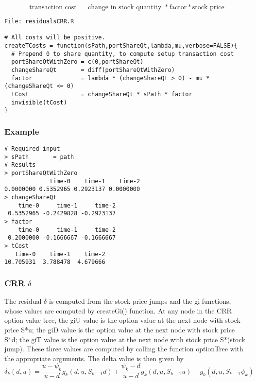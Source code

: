 \documentclass[10pt]{article}
\begin{document}
\[
\text{transaction cost } = \text{change in stock quantity } * \text{factor} * \text{stock price}
\]

\begin{verbatim}
File: residualsCRR.R

# All costs will be positive.
createTCosts = function(sPath,portShareQt,lambda,mu,verbose=FALSE){
  # Prepend 0 to share quantity, to compute setup transaction cost
  portShareQtWithZero = c(0,portShareQt)
  changeShareQt       = diff(portShareQtWithZero)
  factor              = lambda * (changeShareQt > 0) - mu * (changeShareQt <= 0)
  tCost               = changeShareQt * sPath * factor
  invisible(tCost)
}
\end{verbatim}

\subsubsection*{Example}

\begin{verbatim}
# Required input
> sPath       = path
# Results
> portShareQtWithZero
             time-0    time-1    time-2
0.0000000 0.5352965 0.2923137 0.0000000
> changeShareQt
    time-0     time-1     time-2
 0.5352965 -0.2429828 -0.2923137
> factor
    time-0     time-1     time-2
 0.2000000 -0.1666667 -0.1666667
> tCost
   time-0    time-1    time-2
10.705931  3.788478  4.679666
\end{verbatim}


\subsubsection*{CRR  $\delta$}

The residual $\delta$ is computed from the stock price jumps and the gi functions,
whose values are computed by createGi() function. At any node in the CRR option value tree,
the giU value is the option value at the next node with stock price S*u; the giD value
is the option value at the next node with stock price S*d; the giT value is the
option value at the next node with stock price S*(stock jump). These three values
are computed by calling the function optionTree with the appropriate arguments.
The delta value is then given by
\[
\delta_k(d,u) = \frac{u-\psi_k}{u-d} g_k(d,u,S_{k-1}d) + \frac{\psi_k - d}{u-d}g_k(d,u,S_{k-1}u) - g_k(d,u,S_{k-1}\psi_k)
\]
\end{document}
